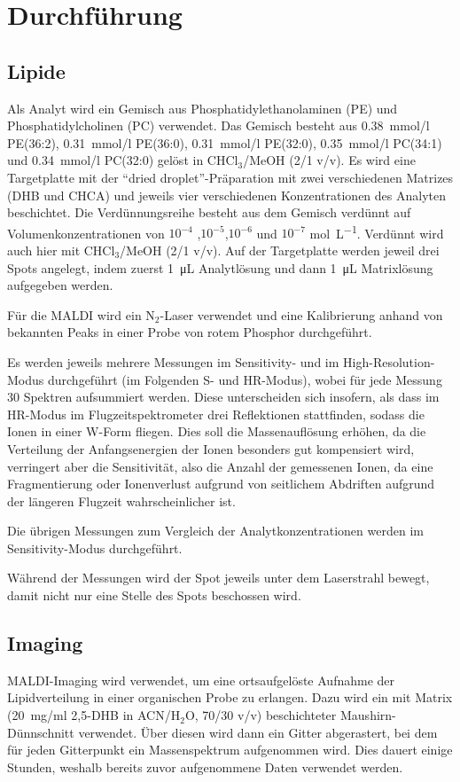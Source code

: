 \section{Durchführung}

\subsection{Lipide}
Als Analyt wird ein Gemisch aus Phosphatidylethanolaminen (PE) und Phosphatidylcholinen (PC) verwendet.
Das Gemisch besteht aus \SI{0,38}{mmol/l} PE(36:2), \SI{0,31}{mmol/l} PE(36:0), \SI{0,31}{mmol/l} PE(32:0), \SI{0,35}{mmol/l} PC(34:1) und \SI{0,34}{mmol/l} PC(32:0) gelöst in CHCl$_3$/MeOH (2/1 v/v). %
Es wird eine Targetplatte mit der \enquote{dried droplet}-Präparation mit zwei verschiedenen Matrizes (DHB und CHCA) und jeweils vier verschiedenen Konzentrationen des Analyten beschichtet.
Die Verdünnungsreihe besteht aus dem Gemisch verdünnt auf Volumenkonzentrationen von $10^{-4}$ ,$10^{-5}$,$10^{-6}$ und $10^{-7}$ \si{\mole \per \liter}.
Verdünnt wird auch hier mit CHCl$_3$/MeOH (2/1 v/v).
Auf der Targetplatte werden jeweil drei Spots angelegt, indem zuerst \SI{1}{\micro \liter} Analytlösung und dann \SI{1}{\micro \liter} Matrixlösung aufgegeben werden.

Für die MALDI wird ein N$_2$-Laser verwendet und eine Kalibrierung anhand von bekannten Peaks in einer Probe von rotem Phosphor durchgeführt.

Es werden jeweils mehrere Messungen im Sensitivity- und im High-Resolution-Modus durchgeführt (im Folgenden S- und HR-Modus), wobei für jede Messung 30 Spektren aufsummiert werden.
Diese unterscheiden sich insofern, als dass im HR-Modus im Flugzeitspektrometer drei Reflektionen stattfinden, sodass die Ionen in einer W-Form fliegen.
Dies soll die Massenauflösung erhöhen, da die Verteilung der Anfangsenergien der Ionen besonders gut kompensiert wird, verringert aber die Sensitivität, also die Anzahl der gemessenen Ionen, da eine Fragmentierung oder Ionenverlust aufgrund von seitlichem Abdriften aufgrund der längeren Flugzeit wahrscheinlicher ist.

Die übrigen Messungen zum Vergleich der Analytkonzentrationen werden im Sensitivity-Modus durchgeführt.

Während der Messungen wird der Spot jeweils unter dem Laserstrahl bewegt, damit nicht nur eine Stelle des Spots beschossen wird.

\subsection{Imaging}

MALDI-Imaging wird verwendet, um eine ortsaufgelöste Aufnahme der Lipidverteilung in einer organischen Probe zu erlangen.
Dazu wird ein mit Matrix (\SI{20}{mg/ml} 2,5-DHB in ACN/H$_2$O, 70/30 v/v) beschichteter Maushirn-Dünnschnitt verwendet.
Über diesen wird dann ein Gitter abgerastert, bei dem für jeden Gitterpunkt ein Massenspektrum aufgenommen wird.
Dies dauert einige Stunden, weshalb bereits zuvor aufgenommene Daten verwendet werden.
